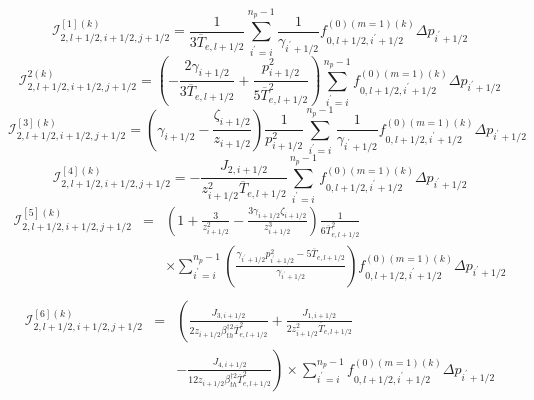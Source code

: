 \begin{equation}
\mathcal{I}_{2,l+1/2,i+1/2,j+1/2}^{\left[ 1\right] \left( k\right) }=\frac{1%
}{3\overline{T}_{e,l+1/2}}\sum_{i^{\prime }=i}^{n_{p}-1}\frac{1}{\gamma
_{i^{\prime }+1/2}}f_{0,l+1/2,i^{\prime }+1/2}^{\left( 0\right) \left(
m=1\right) \left( k\right) }\Delta p_{i^{\prime }+1/2}
\end{equation}
\begin{equation}
\mathcal{I}_{2,l+1/2,i+1/2,j+1/2}^{2\left( k\right) }=\left( -\frac{2\gamma
_{i+1/2}}{3\overline{T}_{e,l+1/2}}+\frac{p_{i+1/2}^{2}}{5\overline{T}
_{e,l+1/2}^{2}}\right) \sum_{i^{\prime }=i}^{n_{p}-1}f_{0,l+1/2,i^{\prime
}+1/2}^{\left( 0\right) \left( m=1\right) \left( k\right) }\Delta
p_{i^{\prime }+1/2}
\end{equation}
\begin{equation}
\mathcal{I}_{2,l+1/2,i+1/2,j+1/2}^{\left[ 3\right] \left( k\right) }=\left(
\gamma _{i+1/2}-\frac{\zeta _{i+1/2}}{z_{i+1/2}}\right) \frac{1}{
p_{i+1/2}^{2}}\sum_{i^{\prime }=i}^{n_{p}-1}\frac{1}{\gamma _{i^{\prime
}+1/2}}f_{0,l+1/2,i^{\prime }+1/2}^{\left( 0\right) \left( m=1\right) \left(
k\right) }\Delta p_{i^{\prime }+1/2}
\end{equation}
\begin{equation}
\mathcal{I}_{2,l+1/2,i+1/2,j+1/2}^{\left[ 4\right] \left( k\right) }=-\frac{
J_{2,i+1/2}}{z_{i+1/2}^{2}\overline{T}_{e,l+1/2}}\sum_{i^{\prime
}=i}^{n_{p}-1}f_{0,l+1/2,i^{\prime }+1/2}^{\left( 0\right) \left( m=1\right)
\left( k\right) }\Delta p_{i^{\prime }+1/2}
\end{equation}
\begin{eqnarray}
\mathcal{I}_{2,l+1/2,i+1/2,j+1/2}^{\left[ 5\right] \left( k\right) }
&=&\left( 1+\frac{3}{z_{i+1/2}^{2}}-\frac{3\gamma _{i+1/2}\zeta _{i+1/2}}{
z_{i+1/2}^{3}}\right) \frac{1}{6\overline{T}_{e,l+1/2}^{2}}  \nonumber \\
&&\times \sum_{i^{\prime }=i}^{n_{p}-1}\left( \frac{\gamma _{i^{\prime
}+1/2}p_{i^{\prime }+1/2}^{2}-5\overline{T}_{e,l+1/2}}{\gamma _{i^{\prime
}+1/2}}\right) f_{0,l+1/2,i^{\prime }+1/2}^{\left( 0\right) \left(
m=1\right) \left( k\right) }\Delta p_{i^{\prime }+1/2}\nonumber \\
\end{eqnarray}
\begin{eqnarray}
\mathcal{I}_{2,l+1/2,i+1/2,j+1/2}^{\left[ 6\right] \left( k\right) }
&=&\left( \frac{J_{3,i+1/2}}{2z_{i+1/2}\beta _{th}^{\dag 2}\overline{T}
_{e,l+1/2}^{2}}+\frac{J_{1,i+1/2}}{2z_{i+1/2}^{2}\overline{T}_{e,l+1/2}}
\right.  \nonumber \\
&&\left. -\frac{J_{4,i+1/2}}{12z_{i+1/2}\beta _{th}^{\dag 2}\overline{T}
_{e,l+1/2}^{2}}\right) \times \sum_{i^{\prime
}=i}^{n_{p}-1}f_{0,l+1/2,i^{\prime }+1/2}^{\left( 0\right) \left( m=1\right)
\left( k\right) }\Delta p_{i^{\prime }+1/2}\nonumber \\
\end{eqnarray}
